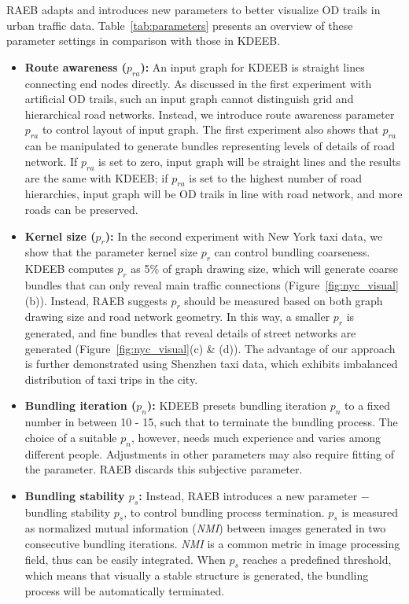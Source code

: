 RAEB adapts and introduces new parameters to better visualize OD trails in urban traffic data.
Table~\ref{tab:parameters} presents an overview of these parameter settings in comparison with those in KDEEB.

\begin{itemize}

\item
\textbf{Route awareness ($p_{ra}$):}
An input graph for KDEEB is straight lines connecting end nodes directly.
As discussed in the first experiment with artificial OD trails, such an input graph cannot distinguish grid and hierarchical road networks.
Instead, we introduce route awareness parameter $p_{ra}$ to control layout of input graph.
The first experiment also shows that $p_{ra}$ can be manipulated to generate bundles representing levels of details of road network.
If $p_{ra}$ is set to zero, input graph will be straight lines and the results are the same with KDEEB;
if $p_{ra}$ is set to the highest number of road hierarchies, input graph will be OD trails in line with road network, and more roads can be preserved.

\vspace{1mm}
\item
\textbf{Kernel size ($p_{r}$):}
In the second experiment with New York taxi data, we show that the parameter kernel size $p_r$ can control bundling coarseness.
KDEEB computes $p_{r}$ as 5\% of graph drawing size, which will generate coarse bundles that can only reveal main traffic connections (Figure~\ref{fig:nyc_visual}(b)).
Instead, RAEB suggests $p_{r}$ should be measured based on both graph drawing size and road network geometry.
In this way, a smaller $p_{r}$ is generated, and fine bundles that reveal details of street networks are generated (Figure~\ref{fig:nyc_visual}(c) \& (d)).
The advantage of our approach is further demonstrated using Shenzhen taxi data, which exhibits imbalanced distribution of taxi trips in the city.

\vspace{1mm}
\item
\textbf{Bundling iteration ($p_{n}$):}
KDEEB presets bundling iteration $p_{n}$ to a fixed number in between 10 - 15, such that to terminate the bundling process.
The choice of a suitable $p_{n}$, however, needs much experience and varies among different people. 
Adjustments in other parameters may also require fitting of the parameter.
RAEB discards this subjective parameter.

\vspace{1mm}
\item
\textbf{Bundling stability $p_{s}$:}
Instead, RAEB introduces a new parameter $-$ bundling stability $p_{s}$, to control bundling process termination.
$p_{s}$ is measured as normalized mutual information (\textit{NMI}) between images generated in two consecutive bundling iterations.
\textit{NMI} is a common metric in image processing field, thus can be easily integrated.
When $p_{s}$ reaches a predefined threshold, which means that visually a stable structure is generated, the bundling process will be automatically terminated.



\end{itemize}
